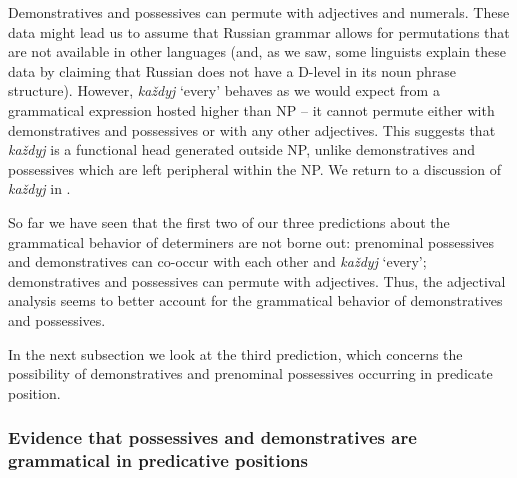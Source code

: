\documentclass[output=paper,
colorlinks,
citecolor=brown,
newtxmath
]{langscibook}
\begin{document}
Demonstratives and possessives can permute with adjectives and numerals. These data might lead us to assume that Russian grammar allows for permutations that are not available in other languages (and, as we saw, some linguists explain these data by claiming that Russian does not have a D-level in its noun phrase structure). However, \textit{každyj} `every' behaves as we would expect from a grammatical expression hosted higher than NP -- it cannot permute either with demonstratives and possessives or with any other adjectives. This suggests that \textit{každyj} is a functional head generated outside NP, unlike demonstratives and possessives which are left peripheral within the NP. We return to a discussion of \textit{každyj} in .


\ea
\z\z


\noindent So far we have seen that the first two of our three predictions about the grammatical behavior of determiners are not borne out: prenominal possessives and demonstratives can co-occur with each other and \textit{každyj} `every'; demonstratives and possessives can permute with adjectives. Thus, the adjectival analysis seems to better account for the grammatical behavior of demonstratives and possessives.

In the next subsection we look at the third prediction, which concerns the possibility of demonstratives and prenominal possessives occurring in predicate position.


\subsubsection{Evidence that possessives and demonstratives are grammatical in predicative positions}\label{subsubsec:evidence}
\end{document}
